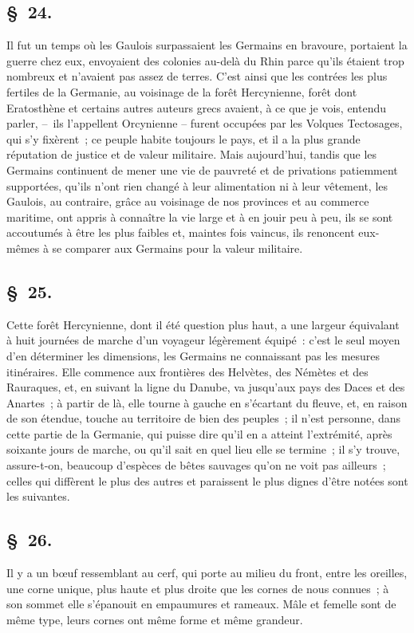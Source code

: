 \documentclass[french,twoside]{book} %
\begin{document}
\subsection[{§ 24.}]{ \textsc{§ 24.} }
\noindent Il fut un temps où les Gaulois surpassaient les Germains en bravoure, portaient la guerre chez eux, envoyaient des colonies au-delà du Rhin parce qu’ils étaient trop nombreux et n’avaient pas assez de terres. C'est ainsi que les contrées les plus fertiles de la Germanie, au voisinage de la forêt Hercynienne, forêt dont Eratosthène et certains autres auteurs grecs avaient, à ce que je vois, entendu parler, – ils l’appellent Orcynienne – furent occupées par les Volques Tectosages, qui s’y fixèrent ; ce peuple habite toujours le pays, et il a la plus grande réputation de justice et de valeur militaire. Mais aujourd’hui, tandis que les Germains continuent de mener une vie de pauvreté et de privations patiemment supportées, qu’ils n’ont rien changé à leur alimentation ni à leur vêtement, les Gaulois, au contraire, grâce au voisinage de nos provinces et au commerce maritime, ont appris à connaître la vie large et à en jouir peu à peu, ils se sont accoutumés à être les plus faibles et, maintes fois vaincus, ils renoncent eux-mêmes à se comparer aux Germains pour la valeur militaire.
\subsection[{§ 25.}]{ \textsc{§ 25.} }
\noindent Cette forêt Hercynienne, dont il été question plus haut, a une largeur équivalant à huit journées de marche d’un voyageur légèrement équipé : c’est le seul moyen d’en déterminer les dimensions, les Germains ne connaissant pas les mesures itinéraires. Elle commence aux frontières des Helvètes, des Némètes et des Rauraques, et, en suivant la ligne du Danube, va jusqu’aux pays des Daces et des Anartes ; à partir de là, elle tourne à gauche en s’écartant du fleuve, et, en raison de son étendue, touche au territoire de bien des peuples ; il n’est personne, dans cette partie de la Germanie, qui puisse dire qu’il en a atteint l’extrémité, après soixante jours de marche, ou qu’il sait en quel lieu elle se termine ; il s’y trouve, assure-t-on, beaucoup d’espèces de bêtes sauvages qu’on ne voit pas ailleurs ; celles qui diffèrent le plus des autres et paraissent le plus dignes d’être notées sont les suivantes.
\subsection[{§ 26.}]{ \textsc{§ 26.} }
\noindent Il y a un bœuf ressemblant au cerf, qui porte au milieu du front, entre les oreilles, une corne unique, plus haute et plus droite que les cornes de nous connues ; à son sommet elle s’épanouit en empaumures et rameaux. Mâle et femelle sont de même type, leurs cornes ont même forme et même grandeur.
\end{document}

